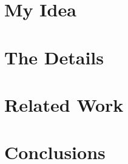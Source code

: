 \documentclass[a4paper]{article}
\begin{document}
\section{My Idea}
\label{sec:idea}


\section{The Details}
\label{sec:details}




  
\section{Related Work}
\label{sec:related}

\section{Conclusions}
\label{sec:conclusions}

{}

\end{document}
